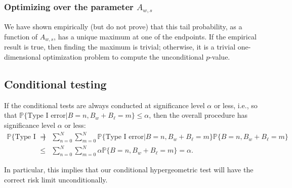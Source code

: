 \subsubsection{Optimizing over the parameter $A_{w,s}$}

We have shown empirically (but do not prove) that this tail probability, as a function of $A_{w,s}$,
has a unique maximum at one of the endpoints.
If the empirical result is true, then finding the maximum is trivial;
otherwise, it is a trivial one-dimensional optimization problem to compute the unconditional $p$-value.

\subsection{Conditional testing}
If the conditional tests are always conducted at significance level $\alpha$ or less, i.e., so that
$\mathbb{P} \{\mbox{Type I error} | B = n, B_w+B_\ell = m\} \le \alpha$, then the
overall procedure has significance level $\alpha$ or less:
\begin{eqnarray}
    \mathbb{P} \{\mbox{Type I error}\} &=& \sum_{n=0}^N\sum_{m=0}^{N} \mathbb{P} \{\mbox{Type I error} |  B = n, B_w+B_\ell = m\} \mathbb{P} \{ B = n, B_w+B_\ell = m \} \nonumber \\
       & \le & \sum_{n=0}^N\sum_{m=0}^{N}  \alpha \mathbb{P} \{  B = n, B_w+B_\ell = m \}  =  \alpha.
\end{eqnarray}

In particular, this implies that our conditional hypergeometric test will have the correct risk limit unconditionally.
